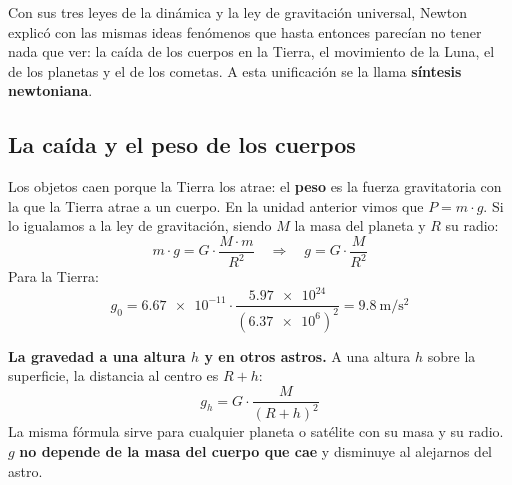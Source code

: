 Con sus tres leyes de la dinámica y la ley de gravitación universal, Newton explicó con las mismas ideas fenómenos que hasta entonces parecían no tener nada que ver: la caída de los cuerpos en la Tierra, el movimiento de la Luna, el de los planetas y el de los cometas. A esta unificación se la llama \textbf{síntesis newtoniana}.

\subsection{La caída y el peso de los cuerpos}

Los objetos caen porque la Tierra los atrae: el \textbf{peso} es la fuerza gravitatoria con la que la Tierra atrae a un cuerpo. En la unidad anterior vimos que \(P = m \cdot g\). Si lo igualamos a la ley de gravitación, siendo \(M\) la masa del planeta y \(R\) su radio:
\[ m \cdot g = G \cdot \frac{M \cdot m}{R^2} \quad\Rightarrow\quad g = G \cdot \frac{M}{R^2} \]
Para la Tierra:
\[ g_0 = \num{6.67e-11} \cdot \frac{\num{5.97e24}}{(\num{6.37e6})^2} = \qty{9.8}{\m\per\square\s} \]

\begin{marker}
    \textbf{La gravedad a una altura \(h\) y en otros astros.} A una altura \(h\) sobre la superficie, la distancia al centro es \(R + h\):
    \[ g_h = G \cdot \frac{M}{(R + h)^2} \]
    La misma fórmula sirve para cualquier planeta o satélite con su masa y su radio. \(g\) \textbf{no depende de la masa del cuerpo que cae} y disminuye al alejarnos del astro.
\end{marker}

